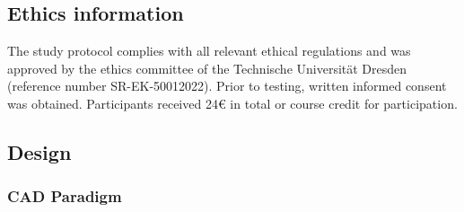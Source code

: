 \documentclass[
  man,floatsintext]{apa6}
\begin{document}
\hypertarget{ethics-information}{%
\subsection{Ethics information}\label{ethics-information}}

The study protocol complies with all relevant ethical regulations and was approved by the ethics committee of the Technische Universität Dresden (reference number SR-EK-50012022).
Prior to testing, written informed consent was obtained.
Participants received 24€ in total or course credit for participation.

\hypertarget{design}{%
\subsection{Design}\label{design}}

\hypertarget{cad-paradigm}{%
\subsubsection{CAD Paradigm}\label{cad-paradigm}}
\end{document}
